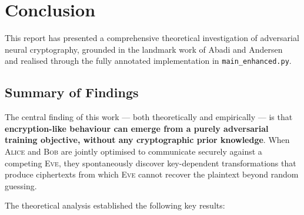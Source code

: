 \documentclass[12pt, a4paper]{article}
\newcommand{\alice}{\textsc{Alice}}
\newcommand{\bob}{\textsc{Bob}}
\newcommand{\eve}{\textsc{Eve}}
\newcommand{\code}[1]{\texttt{\color{CodeRed}#1}}
\begin{document}
\newpage
\section{Conclusion}
\label{sec:conclusion}

This report has presented a comprehensive theoretical investigation of
adversarial neural cryptography, grounded in the landmark work of Abadi
and Andersen~\cite{abadi2016learning} and realised through the fully
annotated implementation in \code{main\_enhanced.py}.

\subsection{Summary of Findings}
\label{subsec:summary}

The central finding of this work --- both theoretically and empirically
--- is that \textbf{encryption-like behaviour can emerge from a purely
adversarial training objective, without any cryptographic prior
knowledge}. When \alice{} and \bob{} are jointly optimised to
communicate securely against a competing \eve{}, they spontaneously
discover key-dependent transformations that produce ciphertexts from
which \eve{} cannot recover the plaintext beyond random guessing.

The theoretical analysis established the following key results:
\end{document}
